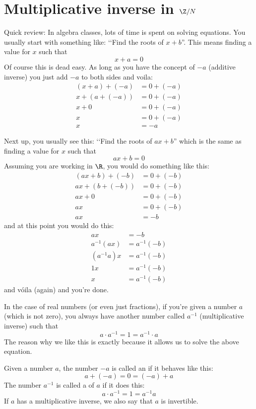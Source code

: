 \section{Multiplicative inverse in $\Z/N$}


Quick review:
In algebra classes, lots of time is spent on solving equations.
You usually start with something like: \lq\lq Find the roots of
$x + b$''. This means finding a value for $x$ such that 
\[
x + a = 0
\]
Of course this is dead easy.
As long as you have the concept of $-a$ (additive inverse)
you just add $-a$ to both sides and 
voila:
\begin{align*}
(x + a) + (-a) &= 0 + (-a) \\
x + (a + (-a)) &= 0 + (-a) \\
x + 0 &= 0 + (-a) \\
x &= 0 + (-a) \\
x &= -a 
\end{align*}

Next up, you usually see this: \lq\lq Find the roots of $ax + b$''
which is the same as finding a value for $x$ such that 
\[
ax + b = 0
\]
Assuming you are working in $\R$, 
you would do something like this:
\begin{align*}
(ax + b) + (-b) &= 0 + (-b) \\
ax +  (b + (-b)) &= 0 + (-b) \\
ax + 0 &= 0 + (-b) \\
ax &= 0 + (-b) \\
ax &= -b 
\end{align*}
and at this point you would do this:
\begin{align*}
ax &= -b \\
a^{-1}(ax) &= a^{-1}(-b) \\
(a^{-1}a)x &= a^{-1}(-b) \\
1x &= a^{-1}(-b) \\
x &= a^{-1}(-b)
\end{align*}
and v\'oila (again) and you're done.

In the case of real numbers (or even just fractions), 
if you're given a number $a$ (which is not zero), you always have
another number called $a^{-1}$ (multiplicative inverse) such that 
\[
a \cdot a^{-1} = 1 = a^{-1} \cdot a
\]
The reason why we like this is exactly because it allows us to solve
the above equation.

Given a number $a$, the number $-a$ is called an
if it behaves like this:
\[
a + (-a) = 0 = (-a) + a
\]
The number $a^{-1}$ is called a  of $a$
if it does this:
\[
a \cdot a^{-1} = 1 = a^{-1} a
\]
If $a$ has a multiplicative inverse, we also say that $a$ is invertible.

